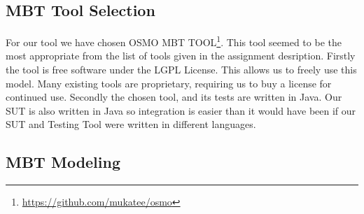 \documentclass[11pt,a4paper]{article}
\begin{document}
\subsection{MBT Tool Selection}

For our tool we have chosen OSMO MBT
TOOL\footnote{\url{https://github.com/mukatee/osmo}}.
This tool seemed to be the most appropriate from the list of tools
given in the assignment desription.
Firstly the tool is free software under the LGPL License. This allows
us to freely use this model. Many existing tools are proprietary,
requiring us to buy a license for continued use.
Secondly the chosen tool, and its tests are written in Java. Our SUT
is also written in Java so integration is easier than it would have
been if our SUT and Testing Tool were written in different languages.

\subsection{MBT Modeling}
\end{document}
